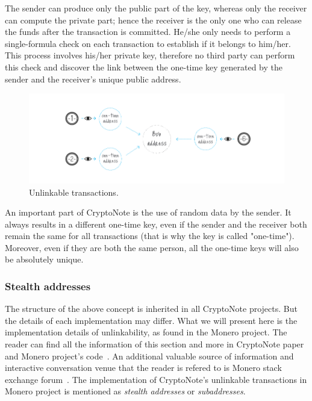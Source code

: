 The sender can produce only the public part of the key, whereas only the receiver can compute the private part; hence the receiver is the only one who can release the funds after the transaction is committed. He/she only needs to perform a single-formula check on each transaction to establish if it belongs to him/her. This process involves his/her private key, therefore no third party can perform this check and discover the link between the one-time key generated by the sender and the receiver's unique public address.
\begin{figure}[H]
  \centering
  \includegraphics[width=0.9 \columnwidth,keepaspectratio]{Images/CryptoNote/unlinkable.png}
  \caption{Unlinkable transactions.~\cite{cryptonote}}
  \label{fig:unlinkable}
\end{figure}
\vspace{0.15cm}

An important part of CryptoNote is the use of random data by the sender. It always results in a different one-time key, even if the sender and the receiver both remain the same for all transactions (that is why the key is called "one-time"). Moreover, even if they are both the same person, all the one-time keys will also be absolutely unique.

\subsubsection{Stealth addresses} \label{sec:stealth}
The structure of the above concept is inherited in all CryptoNote projects. But the details of each implementation may differ. What we will present here is the implementation details of unlinkability, as found in the Monero project. The reader can find all the information of this section and more in CryptoNote paper~\cite{citeulike:14139412} and Monero project's code~\cite{monerocode}. An additional valuable source of information and interactive conversation venue that the reader is refered to is Monero stack exchange forum~\cite{stackexchange}. The implementation of CryptoNote's unlinkable transactions in Monero project is mentioned as \emph{stealth addresses} or \emph{subaddresses}.

